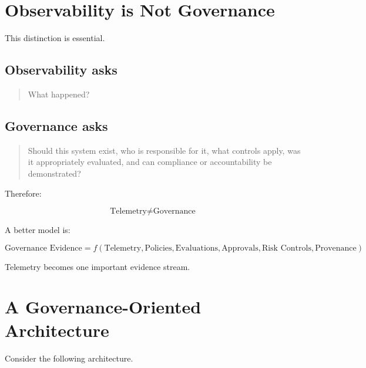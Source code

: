 \documentclass[11pt,a4paper]{article}
\begin{document}
\section{Observability is Not Governance}

This distinction is essential.

\subsection{Observability asks}

\begin{quote}
What happened?
\end{quote}

\subsection{Governance asks}

\begin{quote}
Should this system exist, who is responsible for it, what controls apply, was it appropriately evaluated, and can compliance or accountability be demonstrated?
\end{quote}

Therefore:

\[
\boxed{
\text{Telemetry} \neq \text{Governance}
}
\]

A better model is:

\[
\boxed{
\text{Governance Evidence} = f(
\text{Telemetry}, \text{Policies}, \text{Evaluations}, \text{Approvals}, \text{Risk Controls}, \text{Provenance}
)
}
\]

Telemetry becomes one important evidence stream.

\section{A Governance-Oriented Architecture}

Consider the following architecture.
\end{document}
